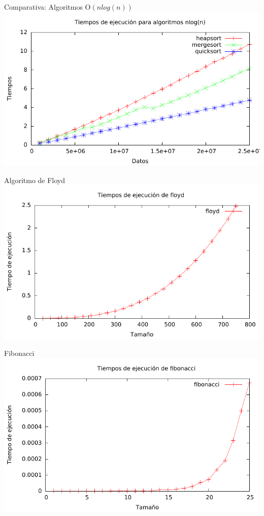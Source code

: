 \documentclass[10pt,compress,usetitleprogressbar,mathserif]{beamer}
\begin{document}
\begin{frame}{Comparativa: Algoritmos O$(nlog(n))$}
		\includegraphics[width = \textwidth ]{comparativa_logaritmicos}
\end{frame}

\begin{frame}{Algoritmo de Floyd}
		\includegraphics[width = \textwidth ]{floyd_g}
\end{frame}

\begin{frame}{Fibonacci}
		\includegraphics[width = \textwidth ]{fibonacci_g}
\end{frame}
\end{document}
